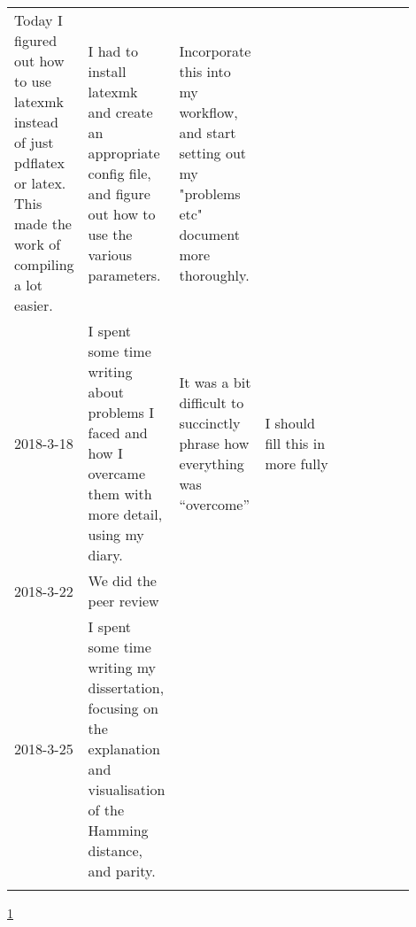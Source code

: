 \documentclass{article}
\begin{document}
\begin{center}
{\begin{longtable}{p{0.1\linewidth} p{0.2\linewidth} p{0.2\linewidth} p{0.2\linewidth} p{0.2\linewidth}}
    Today I figured out how to use latexmk instead of just pdflatex or latex.
    This made the work of compiling a lot easier. &

    I had to install latexmk and create an appropriate config file, and figure
    out how to use the various parameters. &

    Incorporate this into my workflow, and start setting out my "problems etc"
    document more thoroughly. &

    \\ 2018-3-18 &

    I spent some time writing about problems I faced and how I overcame them
    with more detail, using my diary. &

    It was a bit difficult to succinctly phrase how everything was ``overcome''
    &

    I should fill this in more fully &

    \\ 2018-3-22 &

    We did the peer review

    \\ 2018-3-25 &

    I spent some time writing my dissertation, focusing on the explanation
    and visualisation of the Hamming distance, and parity.

    \\

    \bottomrule
    \label{tab:sourceeval}
    \end{longtable}
    }

    \ref{tab:sourceeval}
    \end{center}
\end{document}
